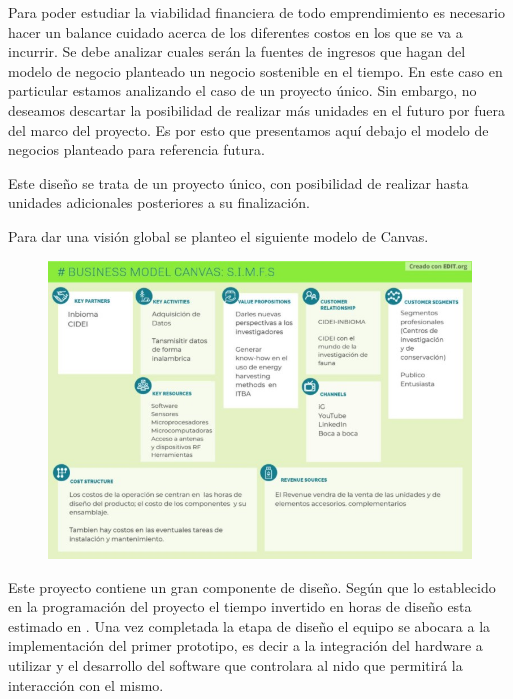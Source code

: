 Para poder estudiar la viabilidad financiera de todo emprendimiento es necesario hacer un balance cuidado acerca de los diferentes costos en los que se va a incurrir. Se debe analizar cuales serán la fuentes de ingresos que hagan del modelo de negocio planteado un negocio sostenible en el tiempo. 
En este caso en particular estamos analizando el caso de un proyecto único. Sin embargo, no deseamos descartar la posibilidad de realizar más unidades en el futuro por fuera del marco del proyecto. Es por esto que presentamos aquí debajo el modelo de negocios planteado para referencia futura. 

Este diseño se trata de un proyecto único, con posibilidad de realizar hasta \TBD unidades adicionales posteriores a su finalización.

Para dar una visión global se planteo el siguiente modelo de Canvas.
 

\begin{figure}[H]
	\centering
	\includegraphics[scale=0.7]{../Factibilidad/ImagenesFactibilidad/ModeloDeCanvas}
	\caption{}
	\label{fig:modelodecanvas}
\end{figure}



Este proyecto contiene un gran componente de diseño. Según que lo establecido en la programación del proyecto el tiempo invertido en horas de diseño esta estimado en  \TBD. 
Una vez completada la etapa de diseño el equipo se abocara a la implementación del primer prototipo, es decir a la integración del hardware a utilizar y el desarrollo del software que controlara al nido que permitirá la interacción con el mismo. 

